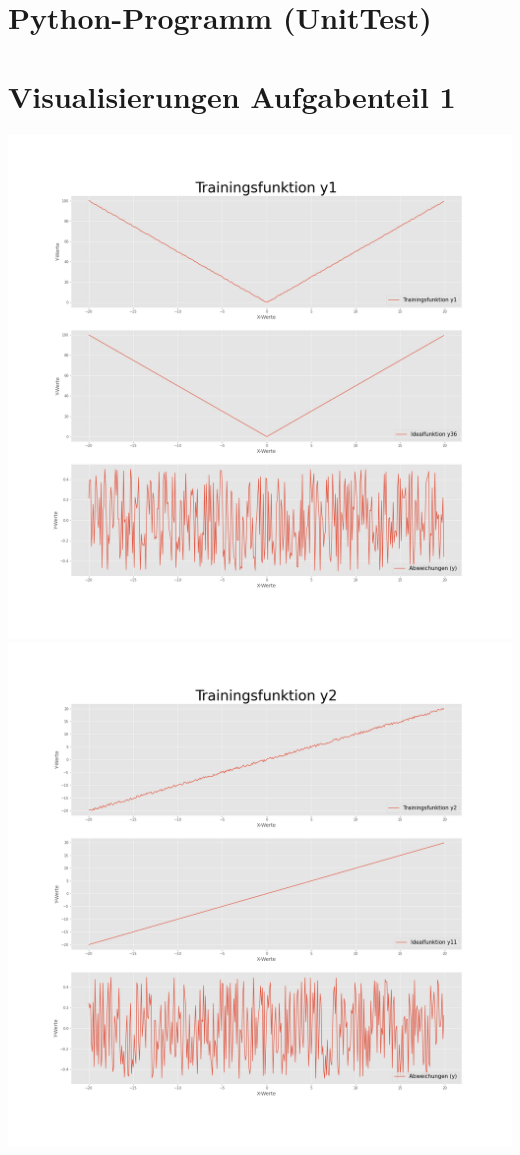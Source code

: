 \documentclass[
    a4paper, 								%
    oneside, 								%
    11pt, 									%
    listof=totoc, 					%
    bibliography=totoc, 		%
    final, 									%
    numbers=noenddot
]{scrreprt}
\begin{document}
\section{Python-Programm (UnitTest)}
\begin{minipage}{\textwidth}	
	
\end{minipage}

\section{Visualisierungen Aufgabenteil 1}
\includegraphics[width=1\textwidth]{Trainingsfunktiony1}
\newpage
\includegraphics[width=1\textwidth]{Trainingsfunktiony2}
\end{document}
